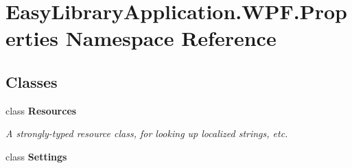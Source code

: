 \hypertarget{namespace_easy_library_application_1_1_w_p_f_1_1_properties}{}\section{Easy\+Library\+Application.\+W\+P\+F.\+Properties Namespace Reference}
\label{namespace_easy_library_application_1_1_w_p_f_1_1_properties}
\subsection*{Classes}
\begin{DoxyCompactItemize}
\item 
class {\bfseries Resources}
\begin{DoxyCompactList}\small\item\em A strongly-\/typed resource class, for looking up localized strings, etc. \end{DoxyCompactList}\item 
class {\bfseries Settings}
\end{DoxyCompactItemize}
